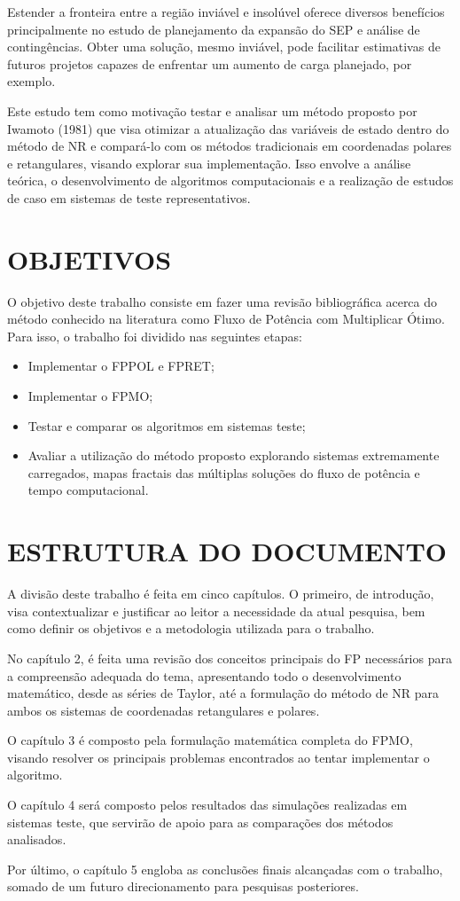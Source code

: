 Estender a fronteira entre a região inviável e insolúvel oferece diversos benefícios principalmente no estudo de planejamento da expansão do \ac{SEP} e análise de contingências. Obter uma solução, mesmo inviável, pode facilitar estimativas de futuros projetos capazes de enfrentar um aumento de carga planejado, por exemplo.

Este estudo tem como motivação testar e analisar um método proposto por Iwamoto (1981)  que visa otimizar a atualização das variáveis de estado dentro do método de \ac{NR} e compará-lo com os métodos tradicionais em coordenadas polares e retangulares, visando explorar sua implementação. Isso envolve a análise teórica, o desenvolvimento de algoritmos computacionais e a realização de estudos de caso em sistemas de teste representativos.

\section{OBJETIVOS}
O objetivo deste trabalho consiste em fazer uma revisão bibliográfica acerca do método conhecido na literatura como Fluxo de Potência com Multiplicar Ótimo. Para isso, o trabalho foi dividido nas seguintes etapas:
\begin{itemize}
    \item Implementar o \ac{FPPOL} e \ac{FPRET};
    \item Implementar o \ac{FPMO};
    \item Testar e comparar os algoritmos em sistemas teste;
    \item Avaliar a utilização do método proposto explorando sistemas extremamente carregados, mapas fractais das múltiplas soluções do fluxo de potência e tempo computacional.
\end{itemize}

\section{ESTRUTURA DO DOCUMENTO}
A divisão deste trabalho é feita em cinco capítulos. O primeiro, de introdução, visa contextualizar e justificar ao leitor a necessidade da atual pesquisa, bem como definir os objetivos e a metodologia utilizada para o trabalho.

No capítulo 2, é feita uma revisão dos conceitos principais do \ac{FP} necessários para a compreensão adequada do tema, apresentando todo o desenvolvimento matemático, desde as séries de Taylor, até a formulação do método de \ac{NR} para ambos os sistemas de coordenadas retangulares e polares.

O capítulo 3 é composto pela formulação matemática completa do \ac{FPMO}, visando resolver os principais problemas encontrados ao tentar implementar o algoritmo.

O capítulo 4 será composto pelos resultados das simulações realizadas em sistemas teste, que servirão de apoio para as comparações dos métodos analisados.

Por último, o capítulo 5 engloba as conclusões finais alcançadas com o trabalho, somado de um futuro direcionamento para pesquisas posteriores.

